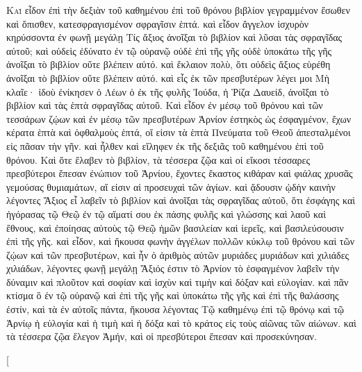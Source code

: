 \begin{pages}
    \begin{Rightside}
        \beginnumbering
		\renewcommand{\LettrineFontHook}{\PHtitl}
		\lettrine[lines=3]{Κ}{αὶ} εἶδον ἐπὶ τὴν δεξιὰν τοῦ καθημένου ἐπὶ τοῦ θρόνου βιβλίον γεγραμμένον ἔσωθεν καὶ ὄπισθεν, κατεσφραγισμένον σφραγῖσιν ἑπτά. καὶ εἶδον ἄγγελον ἰσχυρὸν κηρύσσοντα ἐν φωνῇ μεγάλῃ Τίς ἄξιος ἀνοῖξαι τὸ βιβλίον καὶ λῦσαι τὰς σφραγῖδας αὐτοῦ; καὶ οὐδεὶς ἐδύνατο ἐν τῷ οὐρανῷ οὐδὲ ἐπὶ τῆς γῆς οὐδὲ ὑποκάτω τῆς γῆς ἀνοῖξαι τὸ βιβλίον οὔτε βλέπειν αὐτό. καὶ ἔκλαιον πολὺ, ὅτι οὐδεὶς ἄξιος εὑρέθη ἀνοῖξαι τὸ βιβλίον οὔτε βλέπειν αὐτό.
		\pend
		\pstart
		καὶ εἷς ἐκ τῶν πρεσβυτέρων λέγει μοι Μὴ κλαῖε· ἰδοὺ ἐνίκησεν ὁ Λέων ὁ ἐκ τῆς φυλῆς Ἰούδα, ἡ Ῥίζα Δαυείδ, ἀνοῖξαι τὸ βιβλίον καὶ τὰς ἑπτὰ σφραγῖδας αὐτοῦ. Καὶ εἶδον ἐν μέσῳ τοῦ θρόνου καὶ τῶν τεσσάρων ζῴων καὶ ἐν μέσῳ τῶν πρεσβυτέρων Ἀρνίον ἑστηκὸς ὡς ἐσφαγμένον, ἔχων κέρατα ἑπτὰ καὶ ὀφθαλμοὺς ἑπτά, οἵ εἰσιν τὰ ἑπτὰ Πνεύματα τοῦ Θεοῦ ἀπεσταλμένοι εἰς πᾶσαν τὴν γῆν. καὶ ἦλθεν καὶ εἴληφεν ἐκ τῆς δεξιᾶς τοῦ καθημένου ἐπὶ τοῦ θρόνου. 
		\pend
		\pstart
		Καὶ ὅτε ἔλαβεν τὸ βιβλίον, τὰ τέσσερα ζῷα καὶ οἱ εἴκοσι τέσσαρες πρεσβύτεροι ἔπεσαν ἐνώπιον τοῦ Ἀρνίου, ἔχοντες ἕκαστος κιθάραν καὶ φιάλας χρυσᾶς γεμούσας θυμιαμάτων, αἵ εἰσιν αἱ προσευχαὶ τῶν ἁγίων. καὶ ᾄδουσιν ᾠδὴν καινὴν λέγοντες Ἄξιος εἶ λαβεῖν τὸ βιβλίον καὶ ἀνοῖξαι τὰς σφραγῖδας αὐτοῦ, ὅτι ἐσφάγης καὶ ἠγόρασας τῷ 	Θεῷ ἐν τῷ αἵματί σου ἐκ πάσης φυλῆς καὶ γλώσσης καὶ λαοῦ καὶ ἔθνους, καὶ ἐποίησας αὐτοὺς τῷ Θεῷ ἡμῶν βασιλείαν καὶ ἱερεῖς, καὶ βασιλεύσουσιν ἐπὶ τῆς γῆς.
		\pend
		\pstart
		καὶ εἶδον, καὶ ἤκουσα φωνὴν ἀγγέλων πολλῶν κύκλῳ τοῦ θρόνου καὶ τῶν ζῴων καὶ τῶν πρεσβυτέρων, καὶ ἦν ὁ ἀριθμὸς αὐτῶν μυριάδες μυριάδων καὶ χιλιάδες χιλιάδων, λέγοντες φωνῇ μεγάλῃ Ἄξιός ἐστιν τὸ Ἀρνίον τὸ ἐσφαγμένον λαβεῖν τὴν δύναμιν καὶ πλοῦτον καὶ σοφίαν καὶ 	ἰσχὺν καὶ τιμὴν καὶ δόξαν καὶ εὐλογίαν. καὶ πᾶν κτίσμα ὃ ἐν τῷ οὐρανῷ καὶ ἐπὶ τῆς γῆς καὶ ὑποκάτω τῆς γῆς καὶ ἐπὶ τῆς θαλάσσης ἐστίν, καὶ τὰ ἐν αὐτοῖς πάντα, ἤκουσα λέγοντας Τῷ καθημένῳ ἐπὶ τῷ θρόνῳ καὶ τῷ Ἀρνίῳ ἡ εὐλογία καὶ ἡ τιμὴ καὶ ἡ δόξα καὶ τὸ κράτος εἰς τοὺς αἰῶνας τῶν αἰώνων. καὶ τὰ τέσσερα ζῷα ἔλεγον Ἀμήν, καὶ οἱ πρεσβύτεροι ἔπεσαν καὶ προσεκύνησαν.
		\pend
        \endnumbering
    \end{Rightside}
    \begin{Leftside}
        \beginnumbering
        \pstart[

\end{Leftside}
\end{pages}
